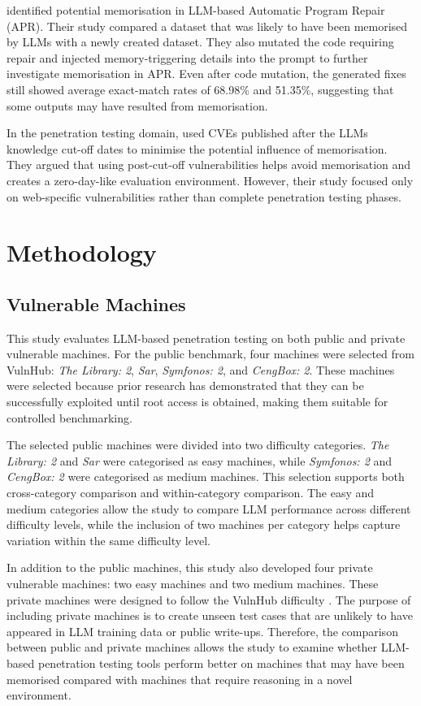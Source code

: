 \documentclass[acmtog]{acmart}
\begin{document}
\citet{kong_demystifying_2025} identified potential memorisation in LLM-based Automatic Program Repair (APR). Their study compared a dataset that was likely to have been memorised by LLMs with a newly created dataset. They also mutated the code requiring repair and injected memory-triggering details into the prompt to further investigate memorisation in APR. Even after code mutation, the generated fixes still showed average exact-match rates of 68.98\% and 51.35\%, suggesting that some outputs may have resulted from memorisation.

In the penetration testing domain, \citet{zhu_teams_2025} used CVEs published after the LLMs knowledge cut-off dates to minimise the potential influence of memorisation. They argued that using post-cut-off vulnerabilities helps avoid memorisation and creates a zero-day-like evaluation environment. However, their study focused only on web-specific vulnerabilities rather than complete penetration testing phases.


\section{Methodology}

\subsection{Vulnerable Machines}

This study evaluates LLM-based penetration testing on both public and private vulnerable machines. For the public benchmark, four machines were selected from VulnHub: \textit{The Library: 2}, \textit{Sar}, \textit{Symfonos: 2}, and \textit{CengBox: 2}. These machines were selected because prior research has demonstrated that they can be successfully exploited until root access is obtained, making them suitable for controlled benchmarking. 

The selected public machines were divided into two difficulty categories. \textit{The Library: 2} and \textit{Sar} were categorised as easy machines, while \textit{Symfonos: 2} and \textit{CengBox: 2} were categorised as medium machines. This selection supports both cross-category comparison and within-category comparison. The easy and medium categories allow the study to compare LLM performance across different difficulty levels, while the inclusion of two machines per category helps capture variation within the same difficulty level.

In addition to the public machines, this study also developed four private vulnerable machines: two easy machines and two medium machines. These private machines were designed to follow the VulnHub difficulty \cite{vulnhub_difficulty}. The purpose of including private machines is to create unseen test cases that are unlikely to have appeared in LLM training data or public write-ups. Therefore, the comparison between public and private machines allows the study to examine whether LLM-based penetration testing tools perform better on machines that may have been memorised compared with machines that require reasoning in a novel environment.
\end{document}
